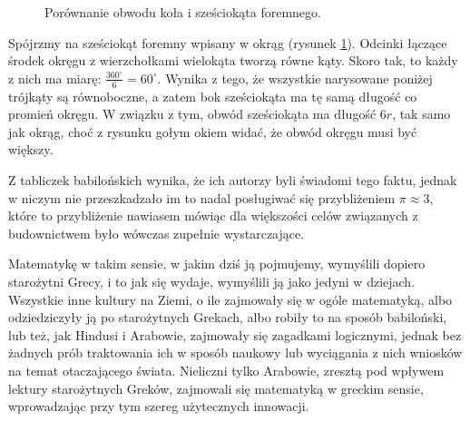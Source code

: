 \documentclass[12pt, a4paper]{scrartcl}
\begin{document}
\begin{figure}[ht!]
    \begin{center}
      \caption{Porównanie obwodu koła i sześciokąta foremnego.}
      \label{fig:approxpi}
  \end{center}
\end{figure}

Spójrzmy na sześciokąt foremny wpisany w okrąg (rysunek \ref{fig:approxpi}).
Odcinki łączące środek okręgu z wierzchołkami wielokąta tworzą równe kąty. Skoro
tak, to każdy z nich ma miarę: \(\frac{360^\circ}{6} = 60^\circ\). Wynika z tego,
że wszystkie narysowane poniżej trójkąty są równoboczne, a zatem bok sześciokąta
ma tę samą długość co promień okręgu. W związku z tym, obwód sześciokąta ma
długość \(6r\), tak samo jak okrąg, choć z rysunku gołym okiem widać, że obwód
okręgu musi być większy.

Z tabliczek babilońskich wynika, że ich autorzy byli świadomi tego faktu, jednak
w niczym nie przeszkadzało im to nadal posługiwać się przybliżeniem $\pi
\approx 3$, które to przybliżenie nawiasem mówiąc dla większości celów
związanych z budownictwem było wówczas zupełnie wystarczające.

Matematykę w takim sensie, w jakim dziś ją pojmujemy, wymyślili dopiero
starożytni Grecy, i to jak się wydaje, wymyślili ją jako jedyni w dziejach.
Wszystkie inne kultury na Ziemi, o ile zajmowały się w ogóle matematyką, albo
odziedziczyły ją po starożytnych Grekach, albo robiły to na sposób babiloński,
lub też, jak Hindusi i Arabowie, zajmowały się zagadkami logicznymi, jednak bez
żadnych prób traktowania ich w sposób naukowy lub wyciągania z nich wniosków na
temat otaczającego świata. Nieliczni tylko Arabowie, zresztą pod wpływem lektury
starożytnych Greków, zajmowali się matematyką w greckim sensie, wprowadzając przy
tym szereg użytecznych innowacji.
\end{document}

